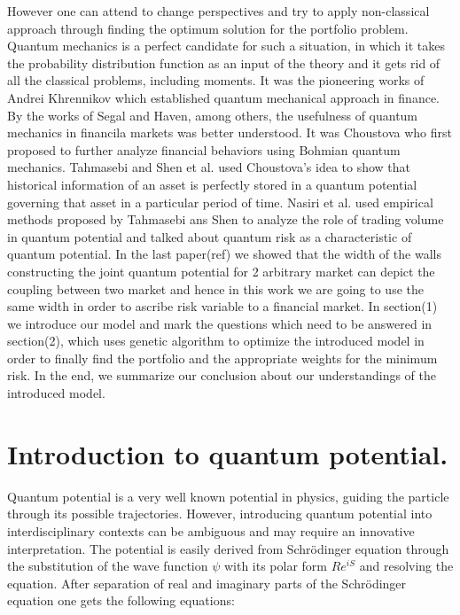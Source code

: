 \documentclass[ aip,jmp,reprint]{revtex4-2}
\begin{document}
However one can attend to change perspectives and try to  apply non-classical approach through finding the optimum solution for the portfolio problem. Quantum mechanics is a perfect candidate for such a situation, in which it takes the probability distribution function as an input of the theory and it gets rid of all the classical problems, including moments. It was the pioneering works of Andrei Khrennikov\cite{Khrennivov1} which established quantum mechanical approach in finance. By the works of Segal\cite{Segal} and Haven\cite{Haven2}, among others, the usefulness of quantum mechanics in financila markets was better understood. It was Choustova\cite{Choustova1} who first proposed to further analyze financial behaviors using Bohmian quantum mechanics. Tahmasebi\cite{Tahmasebi} and Shen et al.\cite{Shen} used Choustova's idea to show that historical information of an asset is perfectly stored in a quantum potential governing that asset in a particular period of time. Nasiri et al.\cite{Nasiri1}\cite{Nasiri2} used empirical methods proposed by Tahmasebi ans Shen to analyze the role of trading volume in quantum potential and talked about quantum risk as a characteristic of quantum potential. In the last paper(ref) 
we showed that the width of the walls constructing the joint quantum potential for 2 arbitrary market can depict the coupling between two market and hence in this work we are going to use the same width in order to ascribe risk variable to a financial market.
In section(1) we introduce our model and mark the questions which need to be answered in section(2), which uses genetic algorithm to optimize the introduced model in order to finally find the portfolio and the appropriate weights for the minimum risk. In the end, we summarize our conclusion about our understandings of the introduced model. 

\section{Introduction to quantum potential.}
Quantum potential is a very well known potential in physics, guiding the particle through its possible 
trajectories. However, introducing quantum potential into interdisciplinary contexts can be ambiguous and may
require an innovative interpretation. The potential is easily derived from Schr\"{o}dinger equation through 
the substitution of the wave function $\psi$ with its polar form $Re^{iS}$ and resolving the equation. 
After separation of real and imaginary parts of the Schr\"{o}dinger equation one gets the following equations:\newline
\end{document}
